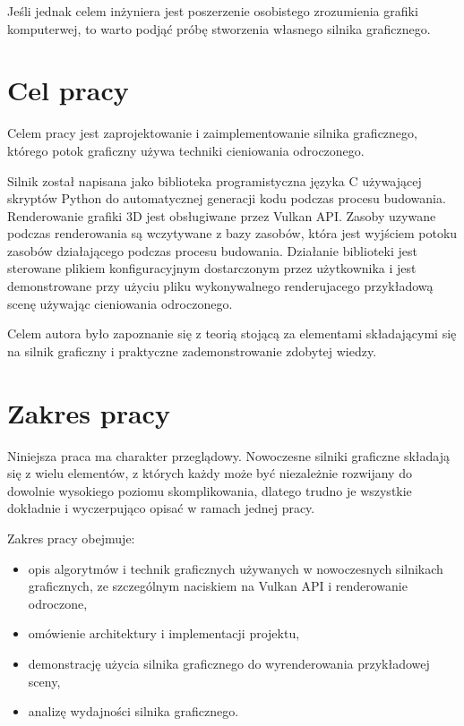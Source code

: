 Jeśli jednak celem inżyniera jest poszerzenie osobistego zrozumienia grafiki komputerwej, to warto podjąć próbę stworzenia własnego silnika graficznego.


\section{Cel pracy}

Celem pracy jest zaprojektowanie i zaimplementowanie silnika graficznego, którego potok graficzny używa techniki cieniowania odroczonego.

Silnik został napisana jako biblioteka programistyczna języka C używającej skryptów Python do automatycznej generacji kodu podczas procesu budowania.
Renderowanie grafiki 3D jest obsługiwane przez Vulkan API.
Zasoby uzywane podczas renderowania są wczytywane z bazy zasobów, która jest wyjściem potoku zasobów działającego podczas procesu budowania.
Działanie biblioteki jest sterowane plikiem konfiguracyjnym dostarczonym przez użytkownika i jest demonstrowane przy użyciu pliku wykonywalnego renderujacego przykładową scenę używając cieniowania odroczonego.

Celem autora było zapoznanie się z teorią stojącą za elementami składającymi się na silnik graficzny i praktyczne zademonstrowanie zdobytej wiedzy.


\section{Zakres pracy}

Niniejsza praca ma charakter przeglądowy. Nowoczesne silniki graficzne składają się z wielu elementów, z których każdy może być niezależnie rozwijany do dowolnie wysokiego poziomu skomplikowania, dlatego trudno je wszystkie dokładnie i wyczerpująco opisać w ramach jednej pracy.

Zakres pracy obejmuje:
\begin{itemize}
	\item {opis algorytmów i technik graficznych używanych w nowoczesnych silnikach graficznych, ze szczególnym naciskiem na Vulkan API i renderowanie odroczone},
	\item{omówienie architektury i implementacji projektu},
	\item{demonstrację użycia silnika graficznego do wyrenderowania przykładowej sceny},
	\item{analizę wydajności silnika graficznego}.
\end{itemize}

